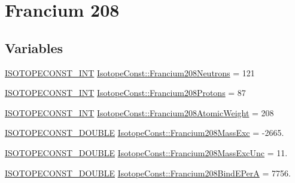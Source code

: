 \hypertarget{group___isotope_const-_francium-_fr208}{}\section{Francium 208}
\label{group___isotope_const-_francium-_fr208}
\subsection*{Variables}
\begin{DoxyCompactItemize}
\item 
\mbox{\hyperlink{group___isotope_const-_macros_ga5f18360b3e99483a35c32d789e62621c}{I\+S\+O\+T\+O\+P\+E\+C\+O\+N\+S\+T\+\_\+\+I\+NT}} \mbox{\hyperlink{group___isotope_const-_francium-_fr208_gad66c99e87dd1b91ad769ace95a1a7de2}{Isotope\+Const\+::\+Francium208\+Neutrons}} = 121
\item 
\mbox{\hyperlink{group___isotope_const-_macros_ga5f18360b3e99483a35c32d789e62621c}{I\+S\+O\+T\+O\+P\+E\+C\+O\+N\+S\+T\+\_\+\+I\+NT}} \mbox{\hyperlink{group___isotope_const-_francium-_fr208_gadb448e7a2569972d955fd7b69289a535}{Isotope\+Const\+::\+Francium208\+Protons}} = 87
\item 
\mbox{\hyperlink{group___isotope_const-_macros_ga5f18360b3e99483a35c32d789e62621c}{I\+S\+O\+T\+O\+P\+E\+C\+O\+N\+S\+T\+\_\+\+I\+NT}} \mbox{\hyperlink{group___isotope_const-_francium-_fr208_ga5b434c9779274b7f8df9451bfe54877d}{Isotope\+Const\+::\+Francium208\+Atomic\+Weight}} = 208
\item 
\mbox{\hyperlink{group___isotope_const-_macros_ga8f45a7272ce02c0b4c65c44636ed719a}{I\+S\+O\+T\+O\+P\+E\+C\+O\+N\+S\+T\+\_\+\+D\+O\+U\+B\+LE}} \mbox{\hyperlink{group___isotope_const-_francium-_fr208_ga35dbc96670bbc62033350fe73fc482e5}{Isotope\+Const\+::\+Francium208\+Mass\+Exc}} = -\/2665.
\item 
\mbox{\hyperlink{group___isotope_const-_macros_ga8f45a7272ce02c0b4c65c44636ed719a}{I\+S\+O\+T\+O\+P\+E\+C\+O\+N\+S\+T\+\_\+\+D\+O\+U\+B\+LE}} \mbox{\hyperlink{group___isotope_const-_francium-_fr208_gad5fc0df1ac6172be72f02a510447352a}{Isotope\+Const\+::\+Francium208\+Mass\+Exc\+Unc}} = 11.
\item 
\mbox{\hyperlink{group___isotope_const-_macros_ga8f45a7272ce02c0b4c65c44636ed719a}{I\+S\+O\+T\+O\+P\+E\+C\+O\+N\+S\+T\+\_\+\+D\+O\+U\+B\+LE}} \mbox{\hyperlink{group___isotope_const-_francium-_fr208_gabf069f53b24853e5b7e01afa8eab81b4}{Isotope\+Const\+::\+Francium208\+Bind\+E\+PerA}} = 7756.
\item 

\end{DoxyCompactItemize}

